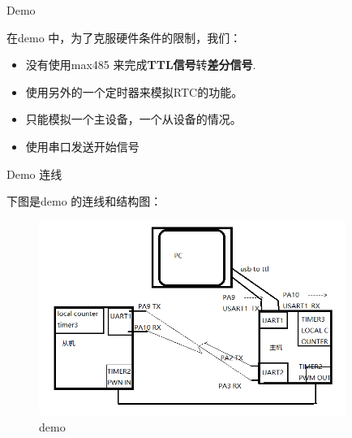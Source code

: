 \begin{frame}[fragile]{Demo}

在demo 中，为了克服硬件条件的限制，我们：
\begin{itemize}
    \item 没有使用max485 来完成\textbf{TTL信号}转\textbf{差分信号}.
    \item 使用另外的一个定时器来模拟RTC的功能。
    \item 只能模拟一个主设备，一个从设备的情况。
    \item 使用串口发送开始信号
\end{itemize}

\end{frame}


\begin{frame}[fragile]{Demo 连线}

下图是demo 的连线和结构图：
\begin{figure}[htbp]
\begin{center}
\includegraphics[width=10cm]{img/demo0}
\caption{demo}
\label{Overview}
\end{center}
\vspace{-0.5em}
\end{figure}

\end{frame}
